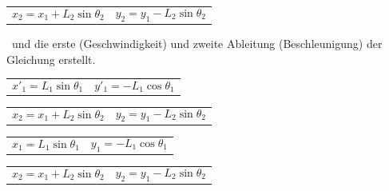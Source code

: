 \documentclass[12pt]{article}
\numberwithin{equation}{subsection}
\begin{document}
\begin{tabularx}{\textwidth}{X X}
	\begin{equation} \label{eq:energy:2_1}
		x_2 = x_1 + L_2\sin\theta_2
	\end{equation}
	&
	\begin{equation} \label{eq:energy:2_2}
		y_2 = y_1 - L_2\sin\theta_2
	\end{equation}
\end{tabularx}

\
und die erste (Geschwindigkeit) und zweite Ableitung (Beschleunigung) der Gleichung erstellt.

\begin{tabularx}{\textwidth}{X X}
	\begin{equation} \label{eq:energy:1_1}
		x'_1 = L_1\sin\theta_1
	\end{equation}
	&
	\begin{equation} \label{eq:energy:1_2}
		y'_1 = -L_1\cos\theta_1
	\end{equation}
\end{tabularx}

\begin{tabularx}{\textwidth}{X X}
	\begin{equation} \label{eq:energy:2_1}
		x_2 = x_1 + L_2\sin\theta_2
	\end{equation}
	&
	\begin{equation} \label{eq:energy:2_2}
		y_2 = y_1 - L_2\sin\theta_2
	\end{equation}
\end{tabularx}

\begin{tabularx}{\textwidth}{X X}
	\begin{equation} \label{eq:energy:1_1}
		x_1 = L_1\sin\theta_1
	\end{equation}
	&
	\begin{equation} \label{eq:energy:1_2}
		y_1 = -L_1\cos\theta_1
	\end{equation}
\end{tabularx}

\begin{tabularx}{\textwidth}{X X}
	\begin{equation} \label{eq:energy:2_1}
		x_2 = x_1 + L_2\sin\theta_2
	\end{equation}
	&
	\begin{equation} \label{eq:energy:2_2}
		y_2 = y_1 - L_2\sin\theta_2
	\end{equation}
\end{tabularx}
\end{document}
